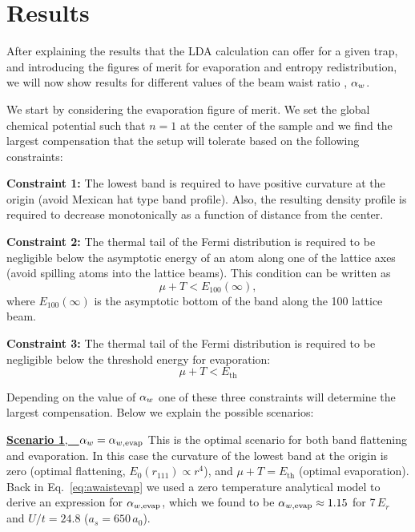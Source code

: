 \section{Results}

After explaining the results that the LDA calculation can offer for a given
trap, and introducing the figures of merit for evaporation and entropy
redistribution,  we will now show results for different values of the beam
waist ratio , $ \alpha_{w} $.  


We start by considering the evaporation figure of merit.  We set the global
chemical potential such that $n=1$ at the center of the sample and we find the
largest compensation that the setup will tolerate based on the following
constraints:

\begin{myblock}
 \textbf{Constraint 1:} The lowest band is required to have positive
curvature at the origin (avoid Mexican hat type band profile).  Also, the
resulting density profile is required to decrease monotonically as a function
of distance from the center.
\end{myblock}
\vspace{-2em}
 
\begin{myblock}
\textbf{Constraint 2:} The thermal tail of the Fermi distribution is required
to be negligible below the asymptotic energy of an atom along one of the
lattice axes (avoid spilling atoms into the lattice beams).  This condition can
be written as   \[  \mu + T < E_{100}(\infty), \] where $E_{100}(\infty)$ is
the asymptotic bottom of the band along the 100 lattice beam.  
\end{myblock} 
\vspace{-2em} 
\begin{myblock} 
\textbf{Constraint 3:} The thermal tail of the Fermi distribution is required
to be negligible below  the threshold energy for evaporation: \[  \mu + T <
E_{\mathrm{th}} \] 
\end{myblock}

Depending on the value of $ \alpha_{w} $ one of these three constraints will
determine the largest compensation.  Below we explain the possible scenarios:


\vspace{-1.5em}
\begin{myblock}
  \underline{\textbf{Scenario 1},~~$ \alpha_{w}  =  \alpha_{w,\text{evap}} $} \newline This is
the optimal scenario for both band flattening and evaporation. In this case the
curvature of the lowest band at the origin is zero (optimal flattening,
$E_{0}(r_{111})\propto r^{4}$),  and $\mu + T = E_{\text{th}}$ (optimal
evaporation).  Back in Eq.~\ref{eq:awaistevap} we used a zero temperature
analytical model to derive an expression for $ \alpha_{w,\text{evap}} $, which we found to
be  $ \alpha_{w,\text{evap}}  \approx 1.15$ for 7\,$E_{r}$ and $U/t=24.8$
($a_{s}=650\,a_{0}$).
\end{myblock}
 
